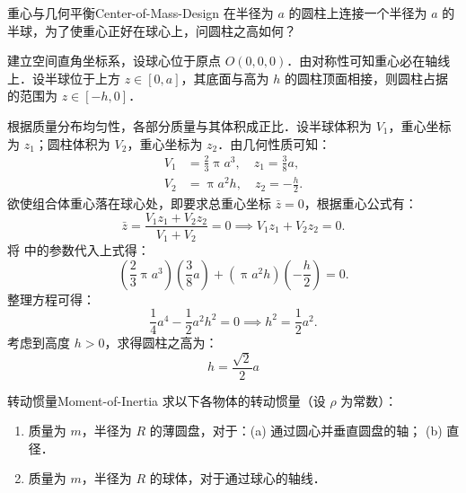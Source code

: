 \begin{problem}{重心与几何平衡}{Center-of-Mass-Design}
    在半径为 $a$ 的圆柱上连接一个半径为 $a$ 的半球，为了使重心正好在球心上，问圆柱之高如何？
\end{problem}

\begin{solution}
    建立空间直角坐标系，设球心位于原点 $O(0, 0, 0)$．由对称性可知重心必在轴线上．设半球位于上方 $z \in [0, a]$，其底面与高为 $h$ 的圆柱顶面相接，则圆柱占据的范围为 $z \in [-h, 0]$．

    根据质量分布均匀性，各部分质量与其体积成正比．设半球体积为 $V_1$，重心坐标为 $z_1$；圆柱体积为 $V_2$，重心坐标为 $z_2$．由几何性质可知：
    \begin{equation}
        \label{eq:Geometry-Params}
        \begin{aligned}
            V_1 & = \frac{2}{3} \uppi a^3, \quad z_1 = \frac{3}{8} a, \\
            V_2 & = \uppi a^2 h, \quad z_2 = -\frac{h}{2}.
        \end{aligned}
    \end{equation}
    欲使组合体重心落在球心处，即要求总重心坐标 $\bar{z} = 0$，根据重心公式有：
    \begin{equation}
        \bar{z} = \frac{V_1 z_1 + V_2 z_2}{V_1 + V_2} = 0 \implies V_1 z_1 + V_2 z_2 = 0.
    \end{equation}
    将  中的参数代入上式得：
    \begin{equation}
        \left( \frac{2}{3} \uppi a^3 \right) \left( \frac{3}{8} a \right) + ( \uppi a^2 h ) \left( -\frac{h}{2} \right) = 0.
    \end{equation}
    整理方程可得：
    \begin{equation}
        \frac{1}{4} a^4 - \frac{1}{2} a^2 h^2 = 0 \implies h^2 = \frac{1}{2} a^2.
    \end{equation}
    考虑到高度 $h > 0$，求得圆柱之高为：
    \begin{equation}
        \boxed{h = \frac{\sqrt{2}}{2} a}
    \end{equation}
\end{solution}

\begin{problem}{转动惯量}{Moment-of-Inertia}
    求以下各物体的转动惯量（设 $\rho$ 为常数）：
    \begin{enumerate}
        \item 质量为 $m$，半径为 $R$ 的薄圆盘，对于：(a) 通过圆心并垂直圆盘的轴； (b) 直径．
        \item 质量为 $m$，半径为 $R$ 的球体，对于通过球心的轴线．
    \end{enumerate}
\end{problem}

